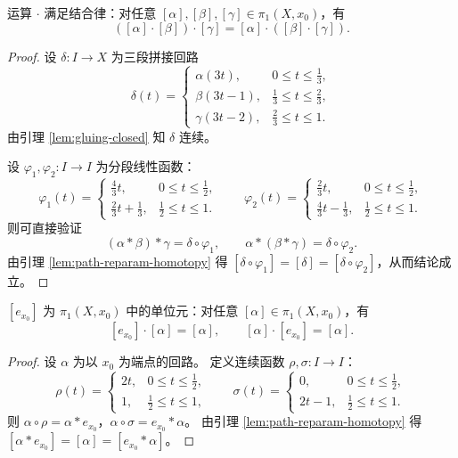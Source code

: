\documentclass[lang=cn,a4paper,newtx,figureplace=section,tableplace=section]{elegantbook}
\begin{document}
\begin{proposition}\label{prop:pi1-associative}
  运算 $\cdot$ 满足结合律：对任意 $[\alpha],[\beta],[\gamma]\in\pi_1(X,x_0)$，有
  \[
    ([\alpha]\cdot[\beta])\cdot[\gamma]=[\alpha]\cdot([\beta]\cdot[\gamma]).
  \]
\end{proposition}
\begin{proof}
  设 $\delta:I\to X$ 为三段拼接回路
  \[
    \delta(t)=\begin{cases}
      \alpha(3t), & 0\le t\le\tfrac13,\\
      \beta(3t-1), & \tfrac13\le t\le\tfrac23,\\
      \gamma(3t-2), & \tfrac23\le t\le 1.
    \end{cases}
  \]
  由引理 \ref{lem:gluing-closed} 知 $\delta$ 连续。

  设 $\varphi_1,\varphi_2:I\to I$ 为分段线性函数：
  \[
    \varphi_1(t)=\begin{cases}
      \tfrac43 t, & 0\le t\le\tfrac12,\\
      \tfrac23 t+\tfrac13, & \tfrac12\le t\le 1.
    \end{cases}
    \qquad
    \varphi_2(t)=\begin{cases}
      \tfrac23 t, & 0\le t\le\tfrac12,\\
      \tfrac43 t-\tfrac13, & \tfrac12\le t\le 1.
    \end{cases}
  \]
  则可直接验证
  \[
    (\alpha\ast\beta)\ast\gamma=\delta\circ\varphi_1,\qquad \alpha\ast(\beta\ast\gamma)=\delta\circ\varphi_2.
  \]
  由引理 \ref{lem:path-reparam-homotopy} 得 $[\delta\circ\varphi_1]=[\delta]=[\delta\circ\varphi_2]$，从而结论成立。
\end{proof}

\begin{proposition}\label{prop:pi1-identity}
  $[e_{x_0}]$ 为 $\pi_1(X,x_0)$ 中的单位元：对任意 $[\alpha]\in\pi_1(X,x_0)$，有
  \[
    [e_{x_0}]\cdot[\alpha]=[\alpha],\qquad [\alpha]\cdot[e_{x_0}]=[\alpha].
  \]
\end{proposition}
\begin{proof}
  设 $\alpha$ 为以 $x_0$ 为端点的回路。
  定义连续函数 $\rho,\sigma:I\to I$：
  \[
    \rho(t)=\begin{cases}
      2t, & 0\le t\le\tfrac12,\\
      1, & \tfrac12\le t\le 1,
    \end{cases}
    \qquad
    \sigma(t)=\begin{cases}
      0, & 0\le t\le\tfrac12,\\
      2t-1, & \tfrac12\le t\le 1.
    \end{cases}
  \]
  则 $\alpha\circ\rho=\alpha\ast e_{x_0}$，$\alpha\circ\sigma=e_{x_0}\ast\alpha$。
  由引理 \ref{lem:path-reparam-homotopy} 得 $[\alpha\ast e_{x_0}]=[\alpha]=[e_{x_0}\ast\alpha]$。
\end{proof}
\end{document}
